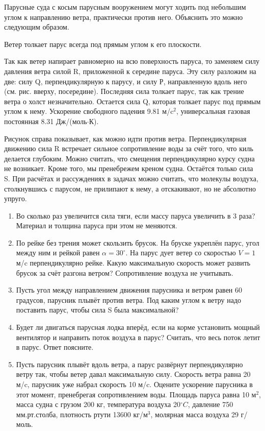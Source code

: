 

Парусные суда с косым парусным вооружением могут ходить под небольшим углом к направлению ветра, 
практически против него. Объяснить это можно следующим образом.

Ветер толкает парус всегда под прямым углом к его плоскости.


Так как ветер напирает равномерно на всю поверхность паруса, то заменяем силу давления ветра силой R, 
приложенной к середине паруса. Эту силу разложим на две: силу Q, перпендикулярную к парусу, и силу Р, 
направленную вдоль него (см. рис. вверху, посередине). Последняя сила толкает парус, так как трение 
ветра о холст незначительно. Остается сила Q, которая толкает парус под прямым углом к нему. 
Ускорение свободного падения 9.81 м/c$^2$, универсальная газовая постоянная 8.31 Дж/(моль$\cdot$К).

Рисунок справа показывает, как можно идти против ветра. Перпендикулярная движению сила R встречает сильное 
сопротивление воды за счёт того, что киль делается глубоким. Можно считать, что смещения перпендикулярно 
курсу судна не возникает. Кроме того, мы пренебрежем креном судна. Остаётся только сила S. При расчётах и 
рассуждениях в задачах можно считать, что молекулы воздуха, столкнувшись с парусом, не прилипают к нему, а 
отскакивают, но не абсолютно упруго.

\begin{enumerate}
    \item Во сколько раз увеличится сила тяги, если массу паруса увеличить в 3 раза? Материал и толщина паруса при этом не меняются.
    \item По рейке без трения может скользить брусок. На бруске укреплён парус, угол между ним и рейкой равен 
    $\alpha = 30^{\circ}$. На парус дует ветер со скоростью $V = 1$ м/c перпендикулярно рейке. Какую 
    максимальную скорость может развить брусок за счёт разгона ветром? Сопротивление воздуха не учитывать.


    \item Пусть угол между направлением движения парусника и ветром равен 60 градусов, парусник плывёт против ветра. Под каким углом к ветру надо поставить парус, чтобы сила S была максимальной?
    \item Будет ли двигаться парусная лодка вперёд, если на корме установить мощный вентилятор и направить поток воздуха в парус? Считать, что весь поток летит в парус. Ответ поясните.
    \item Пусть парусник плывёт вдоль ветра, а парус развёрнут перпендикулярно ветру так, чтобы ветер давал 
    максимальную силу.  Скорость ветра равна 20 м/c, парусник уже набрал скорость 10 м/c. Оцените ускорение 
    парусника в этот момент, пренебрегая сопротивлением воды. Площадь паруса равна 10 м$^2$, масса судна с 
    грузом 200 кг, температура воздуха 20$^{\circ}C$, давление 750 мм.рт.столба, плотность ртути 13600 кг/м$^3$, 
    молярная масса воздуха 29 г/моль.
\end{enumerate}
